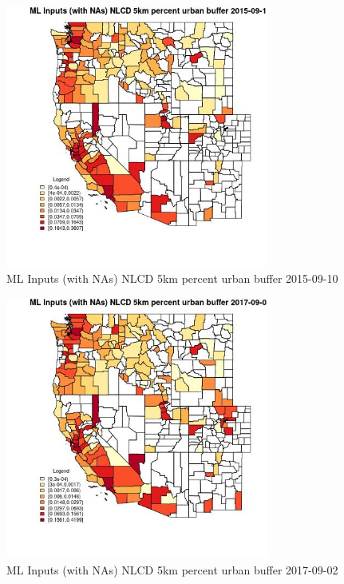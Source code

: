 \begin{figure} 
\centering  
\includegraphics[width=0.77\textwidth]{Code_Outputs/Report_ML_input_PM25_Step4_part_e_de_duplicated_aves_compiled_2019-05-21wNAs_CountyNLCD_5km_percent_urban_bufferMean2015-09-10.jpg} 
\caption{\label{fig:Report_ML_input_PM25_Step4_part_e_de_duplicated_aves_compiled_2019-05-21wNAsCountyNLCD_5km_percent_urban_bufferMean2015-09-10}ML Inputs (with NAs) NLCD 5km percent urban buffer 2015-09-10} 
\end{figure} 
 

\begin{figure} 
\centering  
\includegraphics[width=0.77\textwidth]{Code_Outputs/Report_ML_input_PM25_Step4_part_e_de_duplicated_aves_compiled_2019-05-21wNAs_CountyNLCD_5km_percent_urban_bufferMean2017-09-02.jpg} 
\caption{\label{fig:Report_ML_input_PM25_Step4_part_e_de_duplicated_aves_compiled_2019-05-21wNAsCountyNLCD_5km_percent_urban_bufferMean2017-09-02}ML Inputs (with NAs) NLCD 5km percent urban buffer 2017-09-02} 
\end{figure} 
 

